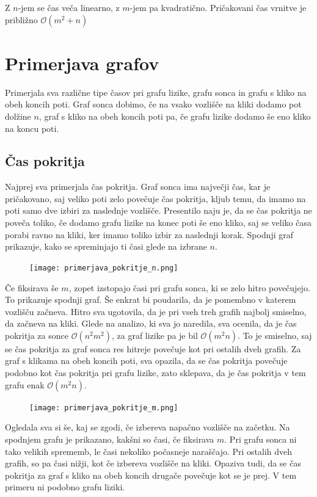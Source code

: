 \documentclass[12pt,a4paper]{amsart}
\begin{document}
Z $n$-jem se čas veča linearno, z $m$-jem pa kvadratično. Pričakovani čas vrnitve je približno $\mathcal{O}(m^2+n)$

\section{Primerjava grafov}

Primerjala sva različne tipe časov pri grafu lizike, grafu sonca in grafu s kliko na obeh koncih poti.
Graf sonca dobimo, če na vsako vozlišče na kliki dodamo pot dolžine $n$, graf s kliko na obeh koncih poti pa, če grafu lizike
dodamo še eno kliko na koncu poti.

\subsection{Čas pokritja}

Najprej sva primerjala čas pokritja. Graf sonca ima največji čas, kar je pričakovano, saj veliko poti zelo 
povečuje čas pokritja, kljub temu, da imamo na poti samo dve izbiri za naslednje vozlišče. Presentilo naju je,
da se čas pokritja ne poveča toliko, če dodamo grafu lizike na konec poti še eno kliko, saj se veliko časa porabi ravno na kliki, 
ker imamo toliko izbir za naslednji korak. Spodnji graf prikazuje, kako se spreminjajo ti časi glede na izbrane $n$.

\begin{figure}[h]
  \texttt{[image: primerjava\_pokritje\_n.png]}
\end{figure}

Če fiksirava še $m$, zopet izstopajo časi pri grafu sonca, ki se zelo hitro povečujejo. 
To prikazuje spodnji graf. Še enkrat bi poudarila, da je pomembno v katerem 
vozlišču začneva. Hitro sva ugotovila, da je pri vseh treh grafih najbolj smiselno, da začneva na kliki. Glede na analizo, ki sva jo naredila,
sva ocenila, da je čas pokritja za sonce $\mathcal{O}(n^2m^2)$, za graf lizike pa je bil $\mathcal{O}(m^2n)$. To je smiselno, saj 
se čas pokritja za graf sonca res hitreje povečuje kot pri ostalih dveh grafih. Za graf s klikama na obeh koncih poti, 
sva opazila, da se čas pokritja povečuje podobno kot čas pokritja pri grafu lizike, zato sklepava, da je čas pokritja v tem grafu enak
$\mathcal{O}(m^2n)$.

\begin{figure}[h]
\texttt{[image: primerjava\_pokritje\_m.png]}
\end{figure}

Ogledala sva si še, kaj se zgodi, če izbereva napačno vozlišče na začetku. Na spodnjem grafu je prikazano, kakšni so časi, če 
fiksirava $m$. Pri grafu sonca ni tako velikih sprememb, le časi nekoliko počasneje naraščajo. Pri ostalih dveh grafih, so pa časi
nižji, kot če izbereva vozlišče na kliki. Opaziva tudi, da se čas pokritja za graf s kliko na obeh koncih drugače povečuje kot se je prej.
V tem primeru ni podobno grafu liziki.
\end{document}
